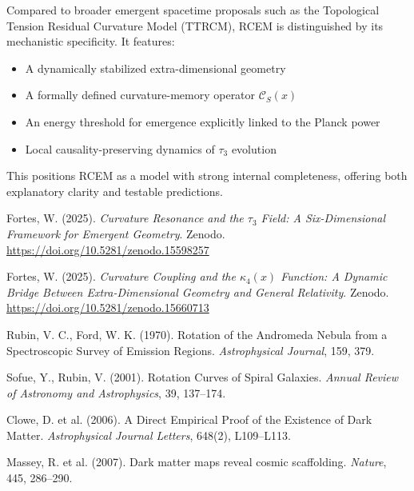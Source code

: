 \documentclass[12pt]{article}
\begin{document}
Compared to broader emergent spacetime proposals such as the Topological Tension Residual Curvature Model (TTRCM), RCEM is distinguished by its mechanistic specificity. It features:
\begin{itemize}
    \item A dynamically stabilized extra-dimensional geometry \cite{fortes2025b}
    \item A formally defined curvature-memory operator $\mathcal{C}_S(x)$ \cite{fortes2025a}
    \item An energy threshold for emergence explicitly linked to the Planck power \cite{fortes2025b}
    \item Local causality-preserving dynamics of $\tau_3$ evolution \cite{fortes2025b}
\end{itemize}
This positions RCEM as a model with strong internal completeness, offering both explanatory clarity and testable predictions.

\begin{thebibliography}{9}
Fortes, W. (2025). \textit{Curvature Resonance and the $\tau_3$ Field: A Six-Dimensional Framework for Emergent Geometry}. Zenodo. \url{https://doi.org/10.5281/zenodo.15598257}

Fortes, W. (2025). \textit{Curvature Coupling and the $\kappa_4(x)$ Function: A Dynamic Bridge Between Extra-Dimensional Geometry and General Relativity}. Zenodo. \url{https://doi.org/10.5281/zenodo.15660713}

Rubin, V. C., Ford, W. K. (1970). Rotation of the Andromeda Nebula from a Spectroscopic Survey of Emission Regions. \textit{Astrophysical Journal}, 159, 379.

Sofue, Y., Rubin, V. (2001). Rotation Curves of Spiral Galaxies. \textit{Annual Review of Astronomy and Astrophysics}, 39, 137–174.

Clowe, D. et al. (2006). A Direct Empirical Proof of the Existence of Dark Matter. \textit{Astrophysical Journal Letters}, 648(2), L109–L113.

Massey, R. et al. (2007). Dark matter maps reveal cosmic scaffolding. \textit{Nature}, 445, 286–290.
\end{thebibliography}
\end{document}
